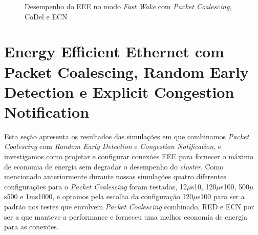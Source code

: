 \begin{figure}[!htb]
    \centering
    \label{fig:PerfEEEFastWakePaCoCodelECN}
    
    \hfill
    
    \caption{\centering Desempenho do EEE no modo \emph{Fast Wake} com \emph{Packet Coalescing}, CoDel e ECN}
\end{figure}



\section{Energy Efficient Ethernet com Packet Coalescing, Random Early Detection e Explicit Congestion Notification}

Esta seção apresenta os resultados das simulações em que combinamos \emph{Packet Coalescing} com \emph{Random Early Detection} e \emph{Congestion Notification}, e investigamos como projetar e configurar conexões EEE para fornecer o máximo de economia de energia sem degradar o desempenho do \emph{cluster}. Como mencionado anteriormente durante nossas simulações quatro diferentes configurações para o \emph{Packet Coalescing} foram testadas, 12$\mu$s10, 120$\mu$s100, 500$\mu$s500 e 1ms1000, e optamos pela escolha da configuração 120$\mu$s100 para ser a padrão nos testes que envolvem \emph{Packet Coalescing} combinado, RED e ECN por ser a que manteve a performance e forneceu uma melhor economia de energia para as conexões.

